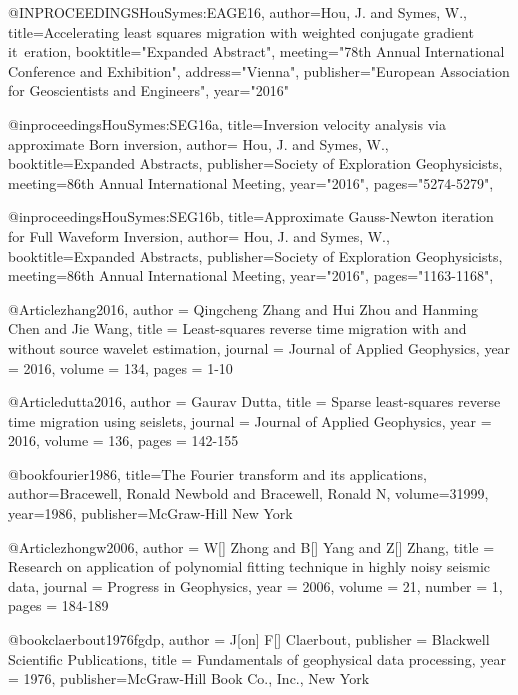 @INPROCEEDINGS{HouSymes:EAGE16,
author={Hou, J. and Symes, W.},
title={Accelerating least squares migration with weighted conjugate gradient it\
eration},
booktitle="Expanded Abstract",
meeting="78th Annual International Conference and Exhibition",
address="Vienna",
publisher="European Association for Geoscientists and Engineers",
year="2016"}

@inproceedings{HouSymes:SEG16a,
title={Inversion velocity analysis via approximate Born inversion},
author= {Hou, J. and Symes, W.},
booktitle={Expanded Abstracts},
publisher={Society of Exploration Geophysicists},
meeting={86th Annual International Meeting},
year="2016",
pages="5274-5279",
}

@inproceedings{HouSymes:SEG16b,
title={Approximate Gauss-Newton iteration for Full Waveform Inversion},
author= {Hou, J. and Symes, W.},
booktitle={Expanded Abstracts},
publisher={Society of Exploration Geophysicists},
meeting={86th Annual International Meeting},
year="2016",
pages="1163-1168",
}

@Article{zhang2016,
  author = 	 {Qingcheng Zhang and Hui Zhou and Hanming Chen and Jie Wang},
  title = 	 {Least-squares reverse time migration with and without source wavelet estimation},
  journal = 	 {Journal of Applied Geophysics},
  year = 	 2016,
  volume = 	 134,
  pages = 	 {1-10}}
  

@Article{dutta2016,
  author = 	 {Gaurav Dutta},
  title = 	 {Sparse least-squares reverse time migration using seislets},
  journal = 	 {Journal of Applied Geophysics},
  year = 	 2016,
  volume = 	 136,
  pages = 	 {142-155}}

@book{fourier1986,
  title={The Fourier transform and its applications},
  author={Bracewell, Ronald Newbold and Bracewell, Ronald N},
  volume={31999},
  year={1986},
  publisher={McGraw-Hill New York}
}


@Article{zhongw2006,
  author = 	 {W[] Zhong and B[] Yang and Z[] Zhang},
  title = 	 {Research on application of polynomial fitting technique in highly noisy seismic data},
  journal = 	 {Progress in Geophysics},
  year = 	 2006,
  volume = 	 21,
  number = 	 1,
  pages = 	 {184-189}}

@book{claerbout1976fgdp,
   author = {J[on] F[] Claerbout},
   publisher = {Blackwell Scientific Publications},
   title = {Fundamentals of geophysical data processing},
   year = {1976},
   publisher={McGraw-Hill Book Co., Inc., New York}
}

